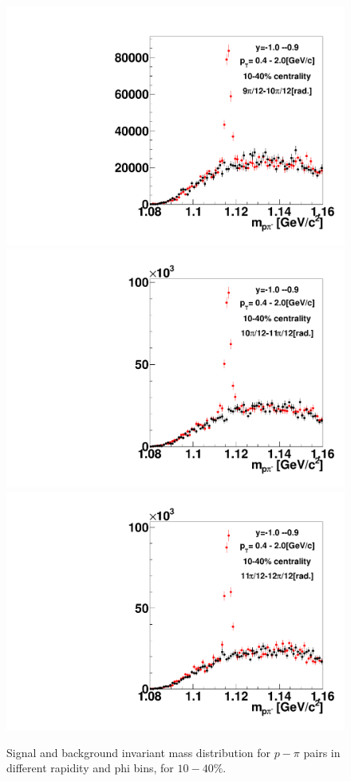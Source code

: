 \begin{figure}[h]
\includegraphics[width=0.14\linewidth]{chapterX/fig/ld_v1_sig/kf_ptslice0_cent1_ld_flow_phi10_rap14_check.pdf}
\includegraphics[width=0.14\linewidth]{chapterX/fig/ld_v1_sig/kf_ptslice0_cent1_ld_flow_phi11_rap14_check.pdf}
\includegraphics[width=0.14\linewidth]{chapterX/fig/ld_v1_sig/kf_ptslice0_cent1_ld_flow_phi12_rap14_check.pdf}

\caption{Signal and background invariant mass distribution for $p-\pi$ pairs in different rapidity and phi bins, for $10-40\%$.}
\label{ld_v1_sig_raw2}
\end{figure}



